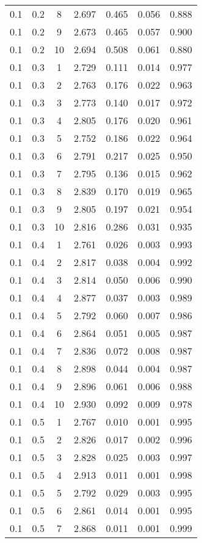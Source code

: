 \begin{tabular}{|c|c|c|c|c|c|c|}
0.1 & 0.2 & 8 & 2.697 & 0.465 & 0.056 & 0.888 \\
0.1 & 0.2 & 9 & 2.673 & 0.465 & 0.057 & 0.900 \\
0.1 & 0.2 & 10 & 2.694 & 0.508 & 0.061 & 0.880 \\
0.1 & 0.3 & 1 & 2.729 & 0.111 & 0.014 & 0.977 \\
0.1 & 0.3 & 2 & 2.763 & 0.176 & 0.022 & 0.963 \\
0.1 & 0.3 & 3 & 2.773 & 0.140 & 0.017 & 0.972 \\
0.1 & 0.3 & 4 & 2.805 & 0.176 & 0.020 & 0.961 \\
0.1 & 0.3 & 5 & 2.752 & 0.186 & 0.022 & 0.964 \\
0.1 & 0.3 & 6 & 2.791 & 0.217 & 0.025 & 0.950 \\
0.1 & 0.3 & 7 & 2.795 & 0.136 & 0.015 & 0.962 \\
0.1 & 0.3 & 8 & 2.839 & 0.170 & 0.019 & 0.965 \\
0.1 & 0.3 & 9 & 2.805 & 0.197 & 0.021 & 0.954 \\
0.1 & 0.3 & 10 & 2.816 & 0.286 & 0.031 & 0.935 \\
0.1 & 0.4 & 1 & 2.761 & 0.026 & 0.003 & 0.993 \\
0.1 & 0.4 & 2 & 2.817 & 0.038 & 0.004 & 0.992 \\
0.1 & 0.4 & 3 & 2.814 & 0.050 & 0.006 & 0.990 \\
0.1 & 0.4 & 4 & 2.877 & 0.037 & 0.003 & 0.989 \\
0.1 & 0.4 & 5 & 2.792 & 0.060 & 0.007 & 0.986 \\
0.1 & 0.4 & 6 & 2.864 & 0.051 & 0.005 & 0.987 \\
0.1 & 0.4 & 7 & 2.836 & 0.072 & 0.008 & 0.987 \\
0.1 & 0.4 & 8 & 2.898 & 0.044 & 0.004 & 0.987 \\
0.1 & 0.4 & 9 & 2.896 & 0.061 & 0.006 & 0.988 \\
0.1 & 0.4 & 10 & 2.930 & 0.092 & 0.009 & 0.978 \\
0.1 & 0.5 & 1 & 2.767 & 0.010 & 0.001 & 0.995 \\
0.1 & 0.5 & 2 & 2.826 & 0.017 & 0.002 & 0.996 \\
0.1 & 0.5 & 3 & 2.828 & 0.025 & 0.003 & 0.997 \\
0.1 & 0.5 & 4 & 2.913 & 0.011 & 0.001 & 0.998 \\
0.1 & 0.5 & 5 & 2.792 & 0.029 & 0.003 & 0.995 \\
0.1 & 0.5 & 6 & 2.861 & 0.014 & 0.001 & 0.995 \\
0.1 & 0.5 & 7 & 2.868 & 0.011 & 0.001 & 0.999 \\

\end{tabular}
